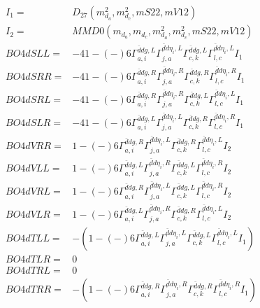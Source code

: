 \documentclass[A4,landscape]{article}
\begin{document}
\begin{align} 
I_1 = & D_{27}(m^2_{d_{{a}}}, m^2_{d_{{c}}}, mS22, mV12) \\ 
I_2 = & MMD0(m_{d_{{a}}}, m_{d_{{c}}}, m^2_{d_{{a}}}, m^2_{d_{{c}}}, mS22, mV12) \\ 
  BO4dSLL= & -4   1
-(-)
  6 \Gamma^{\bar{d}d g ,L}_{a, i} \Gamma^{\bar{d}d \eta_i ,L}_{j, a} \Gamma^{\bar{d}d g ,L}_{c, k} \Gamma^{\bar{d}d \eta_i ,L}_{l, c} I_1 \\ 
  BO4dSRR= & -4   1
-(-)
  6 \Gamma^{\bar{d}d g ,R}_{a, i} \Gamma^{\bar{d}d \eta_i ,R}_{j, a} \Gamma^{\bar{d}d g ,R}_{c, k} \Gamma^{\bar{d}d \eta_i ,R}_{l, c} I_1 \\ 
  BO4dSRL= & -4   1
-(-)
  6 \Gamma^{\bar{d}d g ,R}_{a, i} \Gamma^{\bar{d}d \eta_i ,R}_{j, a} \Gamma^{\bar{d}d g ,L}_{c, k} \Gamma^{\bar{d}d \eta_i ,L}_{l, c} I_1 \\ 
  BO4dSLR= & -4   1
-(-)
  6 \Gamma^{\bar{d}d g ,L}_{a, i} \Gamma^{\bar{d}d \eta_i ,L}_{j, a} \Gamma^{\bar{d}d g ,R}_{c, k} \Gamma^{\bar{d}d \eta_i ,R}_{l, c} I_1 \\ 
  BO4dVRR= &   1
-(-)
  6 \Gamma^{\bar{d}d g ,R}_{a, i} \Gamma^{\bar{d}d \eta_i ,L}_{j, a} \Gamma^{\bar{d}d g ,R}_{c, k} \Gamma^{\bar{d}d \eta_i ,L}_{l, c} I_2 \\ 
  BO4dVLL= &   1
-(-)
  6 \Gamma^{\bar{d}d g ,L}_{a, i} \Gamma^{\bar{d}d \eta_i ,R}_{j, a} \Gamma^{\bar{d}d g ,L}_{c, k} \Gamma^{\bar{d}d \eta_i ,R}_{l, c} I_2 \\ 
  BO4dVRL= &   1
-(-)
  6 \Gamma^{\bar{d}d g ,R}_{a, i} \Gamma^{\bar{d}d \eta_i ,L}_{j, a} \Gamma^{\bar{d}d g ,L}_{c, k} \Gamma^{\bar{d}d \eta_i ,R}_{l, c} I_2 \\ 
  BO4dVLR= &   1
-(-)
  6 \Gamma^{\bar{d}d g ,L}_{a, i} \Gamma^{\bar{d}d \eta_i ,R}_{j, a} \Gamma^{\bar{d}d g ,R}_{c, k} \Gamma^{\bar{d}d \eta_i ,L}_{l, c} I_2 \\ 
  BO4dTLL= & -(  1
-(-)
  6 \Gamma^{\bar{d}d g ,L}_{a, i} \Gamma^{\bar{d}d \eta_i ,L}_{j, a} \Gamma^{\bar{d}d g ,L}_{c, k} \Gamma^{\bar{d}d \eta_i ,L}_{l, c} I_1) \\ 
  BO4dTLR= & 0 \\ 
  BO4dTRL= & 0 \\ 
  BO4dTRR= & -(  1
-(-)
  6 \Gamma^{\bar{d}d g ,R}_{a, i} \Gamma^{\bar{d}d \eta_i ,R}_{j, a} \Gamma^{\bar{d}d g ,R}_{c, k} \Gamma^{\bar{d}d \eta_i ,R}_{l, c} I_1) \\ 
\end{align} 
\end{document}
